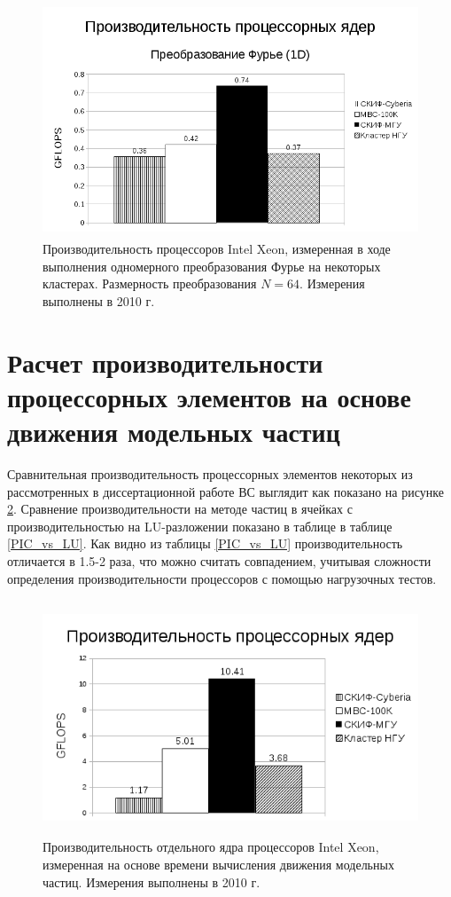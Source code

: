 \begin{figure}[htb]
	\begin{center}
		\includegraphics[height=7cm,keepaspectratio]{images/processor_FLOPS.png}
	\end{center}
	\caption{Производительность процессоров Intel Xeon, измеренная в ходе выполнения одномерного преобразования Фурье на некоторых кластерах. Размерность преобразования $N=64$. Измерения выполнены в 2010 г.}
	\label{procs_flops}
\end{figure} 


\section{Расчет производительности процессорных элементов на основе движения модельных частиц}
\label{calc_PE}
 Сравнительная производительность процессорных элементов некоторых из рассмотренных в диссертационной работе ВС выглядит как показано на рисунке  \ref{procs_flops_pic}.  Сравнение производительности 
 на методе частиц в ячейках с производительностью на LU-разложении показано в таблице в таблице \ref{PIC_vs_LU}. Как видно из таблицы \ref{PIC_vs_LU} производительность отличается в 1.5-2 раза, что можно считать совпадением, учитывая сложности определения производительности процессоров с помощью нагрузочных тестов. 
   
\begin{figure}[htb]
	\begin{center}
		\includegraphics[height=7cm,keepaspectratio]{images/processor_FLOPS_PIC.png}
	\end{center}
	\caption{Производительность отдельного ядра процессоров Intel Xeon, измеренная на основе времени вычисления движения модельных частиц. Измерения выполнены в 2010 г.}
	\label{procs_flops_pic}
\end{figure} 

